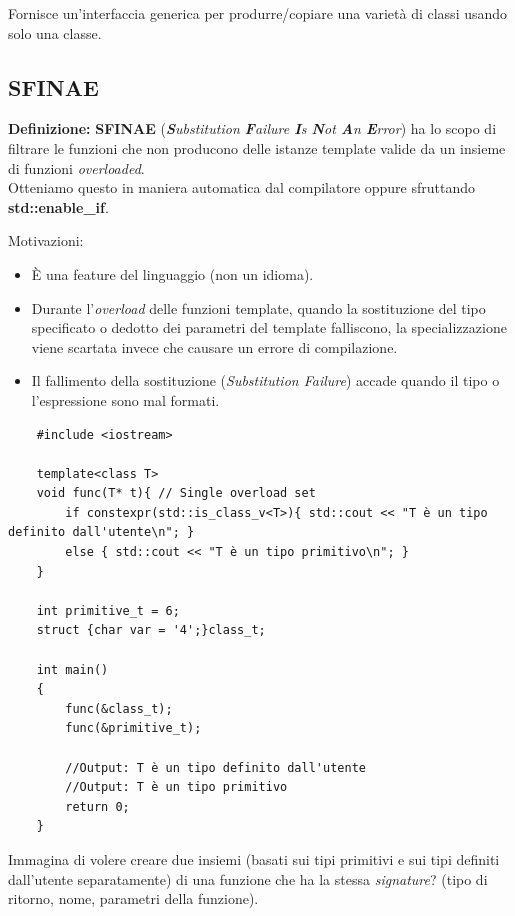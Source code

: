 \textsf{\small Fornisce un'interfaccia generica per produrre/copiare una varietà di classi usando solo una classe.} \\

\subsection{SFINAE}

\textsf{\small \textbf{Definizione: } \textbf{SFINAE} (\emph{\textbf{S}ubstitution \textbf{F}ailure \textbf{I}s \textbf{N}ot \textbf{A}n \textbf{E}rror}) ha lo scopo di filtrare le funzioni che non producono delle istanze template valide da un insieme di funzioni \emph{overloaded}.} \\

\textsf{\small Otteniamo questo in maniera automatica dal compilatore oppure sfruttando \textbf{std::enable\_if}.} \break

\textsf{\small Motivazioni: } \\

\begin{itemize}
	\item \textsf{\small È una feature del linguaggio (non un idioma).}
	\item \textsf{\small Durante l'\emph{overload} delle funzioni template, quando la sostituzione del tipo specificato o dedotto dei parametri del template falliscono, la specializzazione viene scartata invece che causare un errore di compilazione.}
	\item \textsf{\small Il fallimento della sostituzione (\emph{Substitution Failure}) accade quando il tipo o l'espressione sono mal formati.}
\end{itemize}

\begin{lstlisting}
	#include <iostream>
	
	template<class T>
	void func(T* t){ // Single overload set
		if constexpr(std::is_class_v<T>){ std::cout << "T è un tipo definito dall'utente\n"; }
		else { std::cout << "T è un tipo primitivo\n"; }
	}
	
	int primitive_t = 6;
	struct {char var = '4';}class_t;
	
	int main()
	{
		func(&class_t);
		func(&primitive_t);
		
		//Output: T è un tipo definito dall'utente
		//Output: T è un tipo primitivo
		return 0;
	}
\end{lstlisting}

\textsf{\small Immagina di volere creare due insiemi (basati sui tipi primitivi e sui tipi definiti dall'utente separatamente) di una funzione che ha la stessa \emph{signature}? (tipo di ritorno, nome, parametri della funzione).} \\

